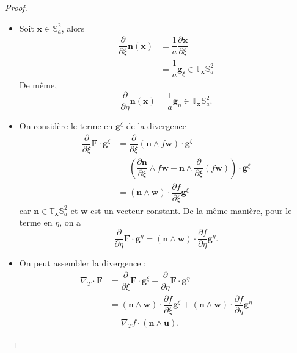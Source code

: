 \begin{proof}
\begin{itemize}
\item Soit $\mathbf{x} \in \mathbb{S}_a^2$, alors 
\begin{align*}
\dfrac{\partial}{\partial \xi} \mathbf{n}(\mathbf{x}) & = \dfrac{1}{a} \dfrac{\partial \mathbf{x}}{\partial \xi} \\
		& = \dfrac{1}{a} \mathbf{g}_{\xi} \in \mathbb{T}_{\mathbf{x}} \mathbb{S}_a^2
\end{align*}
De même, 
\begin{equation*}
\dfrac{\partial}{\partial \eta} \mathbf{n}(\mathbf{x})= \dfrac{1}{a} \mathbf{g}_{\eta} \in \mathbb{T}_{\mathbf{x}} \mathbb{S}_a^2.
\end{equation*}

\item On considère le terme en $\mathbf{g}^\xi$ de la divergence
\begin{align*}
\dfrac{\partial}{\partial \xi} \mathbf{F} \cdot \mathbf{g}^{\xi} & = \dfrac{\partial}{\partial \xi} \left( \mathbf{n} \wedge f \mathbf{w} \right) \cdot \mathbf{g}^{\xi} \\
	& = \left( \dfrac{\partial \mathbf{n}}{\partial \xi} \wedge f \mathbf{w} + \mathbf{n} \wedge  \dfrac{\partial}{\partial \xi} \left( f \mathbf{w} \right) \right) \cdot \mathbf{g}^{\xi} \\
	& = \left( \mathbf{n} \wedge \mathbf{w} \right) \cdot \dfrac{\partial f}{\partial \xi} \mathbf{g}^{\xi}
\end{align*}
car $\mathbf{n} \in \mathbb{T}_{\mathbf{x}} \mathbb{S}_a^2$ et $\mathbf{w}$ est un vecteur constant.
De la même manière, pour le terme en $\eta$, on a 
\begin{equation*}
\dfrac{\partial}{\partial \eta} \mathbf{F} \cdot \mathbf{g}^{\eta} = \left( \mathbf{n} \wedge \mathbf{w} \right) \cdot \dfrac{\partial f}{\partial \eta} \mathbf{g}^{\eta}.
\end{equation*}

\item On peut assembler la divergence :
\begin{align*}
\nabla_T \cdot \mathbf{F} & = \dfrac{\partial}{\partial \xi} \mathbf{F} \cdot \mathbf{g}^{\xi} + \dfrac{\partial}{\partial \eta} \mathbf{F} \cdot \mathbf{g}^{\eta}\\
	& = \left( \mathbf{n} \wedge \mathbf{w} \right) \cdot \dfrac{\partial f}{\partial \xi} \mathbf{g}^{\xi} + \left( \mathbf{n} \wedge \mathbf{w} \right) \cdot \dfrac{\partial f}{\partial \eta} \mathbf{g}^{\eta}\\
	& = \nabla_T f \cdot \left( \mathbf{n} \wedge \mathbf{u} \right).
\end{align*}
\end{itemize}
\end{proof}
